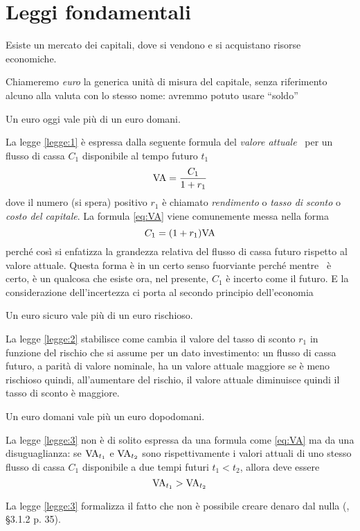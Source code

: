 
\chapter{Leggi fondamentali}
\label{chap:Leggi_fondamentali}

\begin{legge}\label{law:0}
  Esiste un mercato dei capitali, dove si vendono e si acquistano risorse economiche.
\end{legge}

Chiameremo \emph{euro} la generica unità di misura del capitale, senza riferimento alcuno alla
valuta con lo stesso nome: avremmo potuto usare ``soldo''

\begin{legge}\label{legge:1}
  Un euro oggi vale più di un euro domani.
\end{legge}

La legge \ref{legge:1} è espressa dalla seguente formula del \emph{valore attuale}
\VA\ per un flusso di cassa  $C_1$ disponibile al tempo futuro $t_1$
\begin{equation}
  \label{eq:VA}
  \mathrm{VA}=\frac{C_1}{1+r_1}
\end{equation}
dove il numero (si spera) positivo $r_1$ è chiamato \emph{rendimento} o \emph{tasso di sconto} o
\emph{costo del capitale}.
La formula \eqref{eq:VA} viene comunemente messa nella forma
\[
  C_1=(1+r_1)\mathrm{VA}
\]
perché così si enfatizza la grandezza relativa del flusso di cassa futuro rispetto al valore attuale.
Questa forma è in un certo senso fuorviante perché mentre \VA\ è certo, è un qualcosa che esiste ora,
nel presente, $C_1$ è incerto come il futuro. E la considerazione dell'incertezza ci porta al secondo
principio dell'economia

\begin{legge}\label{legge:2}
  Un euro sicuro vale più di un euro rischioso.  
\end{legge}

La legge \ref{legge:2} stabilisce come cambia il valore del tasso di sconto $r_1$ in funzione del
rischio che si assume per un dato investimento: un flusso di cassa futuro, a parità di valore nominale,
ha un valore attuale maggiore se è meno rischioso quindi, all'aumentare del rischio, il valore attuale
diminuisce quindi il tasso di sconto è maggiore. 

\begin{legge}\label{legge:3}
  Un euro domani vale più un euro dopodomani.
\end{legge}

La legge \ref{legge:3} non è di solito espressa da una formula come \eqref{eq:VA} ma da una disuguaglianza:
se $\mathrm{VA}_{t_1}$ e $\mathrm{VA}_{t_2}$ sono rispettivamente i valori attuali di uno stesso flusso di cassa $C_1$ disponibile
a due tempi futuri $t_1<t_2$, allora deve essere
\begin{equation}
  \label{eq:legge2}
  \mathrm{VA}_{t_1}>\mathrm{VA}_{t_2}
\end{equation}

La legge \ref{legge:3} formalizza il fatto che non è possibile creare denaro dal nulla (\cite{brealey_et_al1999},
§3.1.2 p. 35).